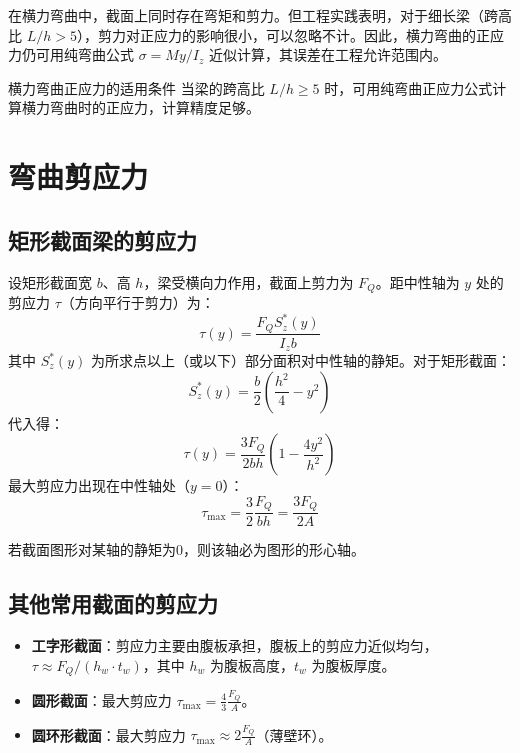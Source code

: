 在横力弯曲中，截面上同时存在弯矩和剪力。但工程实践表明，对于细长梁（跨高比 \(L/h > 5\)），剪力对正应力的影响很小，可以忽略不计。因此，横力弯曲的正应力仍可用纯弯曲公式 \(\sigma = M y / I_z\) 近似计算，其误差在工程允许范围内。

\begin{myTheorem}{横力弯曲正应力的适用条件}
    当梁的跨高比 \(L/h \ge 5\) 时，可用纯弯曲正应力公式计算横力弯曲时的正应力，计算精度足够。
\end{myTheorem}

\section{弯曲剪应力}

\subsection{矩形截面梁的剪应力}
设矩形截面宽 \(b\)、高 \(h\)，梁受横向力作用，截面上剪力为 \(F_Q\)。距中性轴为 \(y\) 处的剪应力 \(\tau\)（方向平行于剪力）为：
\[
\tau(y) = \frac{F_Q S_z^*(y)}{I_z b}
\]
其中 \(S_z^*(y)\) 为所求点以上（或以下）部分面积对中性轴的静矩。对于矩形截面：
\[
S_z^*(y) = \frac{b}{2} \left( \frac{h^2}{4} - y^2 \right)
\]
代入得：
\[
\tau(y) = \frac{3 F_Q}{2 b h} \left( 1 - \frac{4 y^2}{h^2} \right)
\]
最大剪应力出现在中性轴处（\(y=0\)）：
\[
\tau_{\max} = \frac{3}{2} \frac{F_Q}{b h} = \frac{3 F_Q}{2 A}
\]

\begin{myformula}
     \quad {}
\end{myformula}
\begin{remark}
  若截面图形对某轴的静矩为0，则该轴必为图形的形心轴。
\end{remark}
\subsection{其他常用截面的剪应力}
\begin{itemize}
    \item \textbf{工字形截面}：剪应力主要由腹板承担，腹板上的剪应力近似均匀，\(\tau \approx F_Q / (h_w \cdot t_w)\)，其中 \(h_w\) 为腹板高度，\(t_w\) 为腹板厚度。
    \item \textbf{圆形截面}：最大剪应力 \(\tau_{\max} = \frac{4}{3} \frac{F_Q}{A}\)。
    \item \textbf{圆环形截面}：最大剪应力 \(\tau_{\max} \approx 2 \frac{F_Q}{A}\)（薄壁环）。
\end{itemize}

